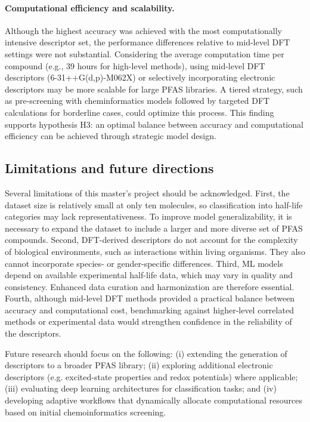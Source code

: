 \paragraph{Computational efficiency and scalability.}
Although the highest accuracy was achieved with the most computationally intensive descriptor set, the performance differences relative to mid-level DFT settings were not substantial. Considering the average computation time per compound (e.g., 39 hours for high-level methods), using mid-level DFT descriptors (6-31++G(d,p)-M062X) or selectively incorporating electronic descriptors may be more scalable for large PFAS libraries. A tiered strategy, such as pre-screening with cheminformatics models followed by targeted DFT calculations for borderline cases, could optimize this process. This finding supports hypothesis H3: an optimal balance between accuracy and computational efficiency can be achieved through strategic model design.

\subsection{Limitations and future directions}

Several limitations of this master’s project should be acknowledged. First, the dataset size is relatively small at only ten molecules, so classification into half-life categories may lack representativeness. To improve model generalizability, it is necessary to expand the dataset to include a larger and more diverse set of PFAS compounds. Second, DFT-derived descriptors do not account for the complexity of biological environments, such as interactions within living organisms. They also cannot incorporate species- or gender-specific differences. Third, ML models depend on available experimental half-life data, which may vary in quality and consistency. Enhanced data curation and harmonization are therefore essential. Fourth, although mid-level DFT methods provided a practical balance between accuracy and computational cost, benchmarking against higher-level correlated methods or experimental data would strengthen confidence in the reliability of the descriptors.

Future research should focus on the following: (i) extending the generation of descriptors to a broader PFAS library; (ii) exploring additional electronic descriptors (e.g. excited-state properties and redox potentials) where applicable; (iii) evaluating deep learning architectures for classification tasks; and (iv) developing adaptive workflows that dynamically allocate computational resources based on initial chemoinformatics screening.
